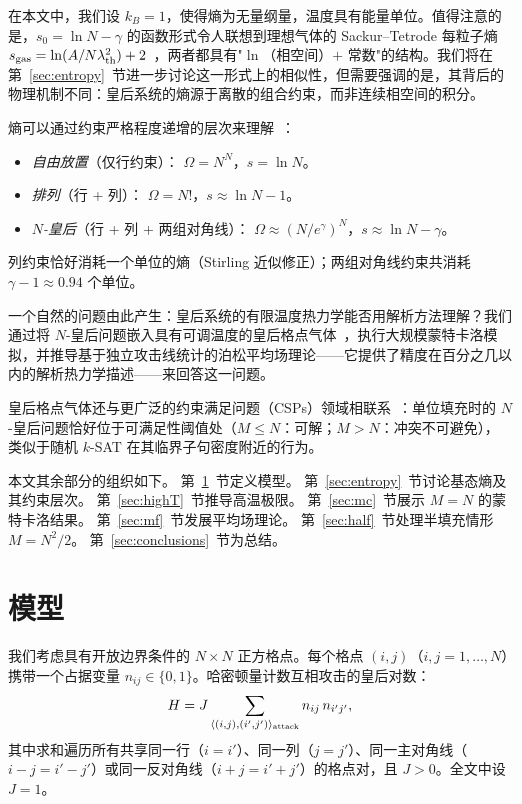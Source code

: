 \documentclass[aps, pre, reprint, amsmath, amssymb, superscriptaddress, floatfix]{revtex4-2}
\begin{document}
在本文中，我们设 $k_B = 1$，使得熵为无量纲量，温度具有能量单位。值得注意的是，$s_0 = \ln N - \gamma$ 的函数形式令人联想到理想气体的 Sackur--Tetrode 每粒子熵 $s_{\rm gas} = \ln(A/N\lambda_{\rm th}^2) + 2$~\cite{Reif1965}，两者都具有"$\ln$（相空间）$+$ 常数"的结构。我们将在第~\ref{sec:entropy}~节进一步讨论这一形式上的相似性，但需要强调的是，其背后的物理机制不同：皇后系统的熵源于离散的组合约束，而非连续相空间的积分。

熵可以通过约束严格程度递增的层次来理解~\cite{Knuth2022}：
\begin{itemize}
  \item \textit{自由放置}（仅行约束）：
    $\Omega = N^N$，$s = \ln N$。
  \item \textit{排列}（行 + 列）：
    $\Omega = N!$，$s \approx \ln N - 1$。
  \item \textit{$N$-皇后}（行 + 列 + 两组对角线）：
    $\Omega \approx (N/e^\gamma)^N$，$s \approx \ln N - \gamma$。
\end{itemize}
列约束恰好消耗一个单位的熵（Stirling 近似修正）；两组对角线约束共消耗 $\gamma - 1 \approx 0.94$ 个单位。

一个自然的问题由此产生：皇后系统的有限温度热力学能否用解析方法理解？我们通过将 $N$-皇后问题嵌入具有可调温度的皇后格点气体~\cite{Zhang2009,Polson2024}，执行大规模蒙特卡洛模拟，并推导基于独立攻击线统计的泊松平均场理论——它提供了精度在百分之几以内的解析热力学描述——来回答这一问题。

皇后格点气体还与更广泛的约束满足问题（CSPs）领域相联系~\cite{Mezard2009,Krzakala2007}：单位填充时的 $N$-皇后问题恰好位于可满足性阈值处（$M \le N$：可解；$M > N$：冲突不可避免），类似于随机 $k$-SAT 在其临界子句密度附近的行为。

本文其余部分的组织如下。
第~\ref{sec:model}~节定义模型。
第~\ref{sec:entropy}~节讨论基态熵及其约束层次。
第~\ref{sec:highT}~节推导高温极限。
第~\ref{sec:mc}~节展示 $M = N$ 的蒙特卡洛结果。
第~\ref{sec:mf}~节发展平均场理论。
第~\ref{sec:half}~节处理半填充情形 $M = N^2/2$。
第~\ref{sec:conclusions}~节为总结。


\section{模型}
\label{sec:model}

我们考虑具有开放边界条件的 $N \times N$ 正方格点。每个格点 $(i,j)$（$i,j = 1,\ldots,N$）携带一个占据变量 $n_{ij} \in \{0,1\}$。哈密顿量计数互相攻击的皇后对数：
\begin{equation}
  H = J \sum_{\langle (i,j),(i',j') \rangle_{\rm attack}}
  n_{ij}\, n_{i'j'},
  \label{eq:H}
\end{equation}
其中求和遍历所有共享同一行（$i = i'$）、同一列（$j = j'$）、同一主对角线（$i - j = i' - j'$）或同一反对角线（$i + j = i' + j'$）的格点对，且 $J > 0$。全文中设 $J = 1$。
\end{document}
